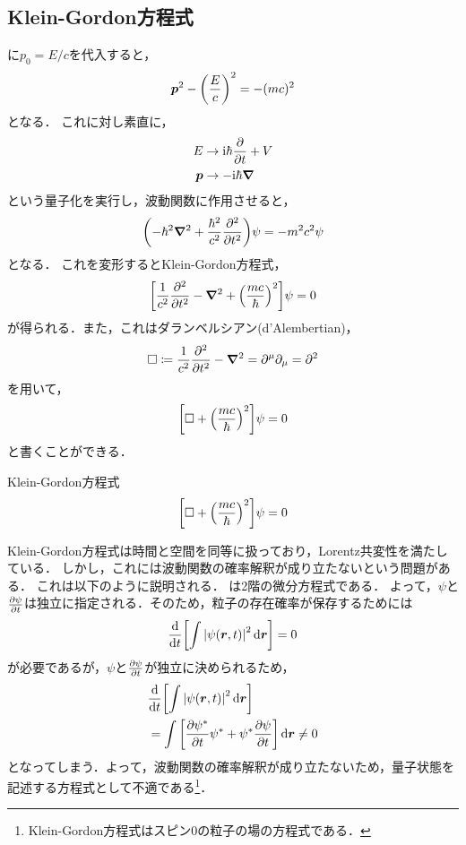 \documentclass{report}
\begin{document}
  \subsection{Klein-Gordon方程式}
    に$p_0 = E/c$を代入すると，
    \begin{align}
      \bm{p}^2 - \qty(\frac{E}{c})^2 = -(mc)^2
    \end{align}
    となる．
    これに対し素直に，
    \begin{align}
      E &\to \mathrm{i}\hbar\pdv{t} + V \\ 
      \bm{p} &\to - \mathrm{i}\hbar\grad 
    \end{align}
    という量子化を実行し，波動関数に作用させると，
    \begin{align}
      \qty(-\hbar^2\grad^2 + \frac{\hbar^2}{c^2}\pdv[2]{t})\psi = -m^2c^2\psi
    \end{align}
    となる．
    これを変形するとKlein-Gordon方程式，
    \begin{align}
      \qty[\frac{1}{c^2}\pdv[2]{t} - \grad^2 + \qty(\frac{mc}{\hbar})^2]\psi = 0 
    \end{align}
    が得られる．また，これはダランベルシアン(d'Alembertian)，
    \begin{align}
      \Box \coloneqq \frac{1}{c^2}\pdv[2]{t} - \grad^2 = \partial^\mu\partial_\mu = \partial^2
    \end{align}
    を用いて，
    \begin{align}
      \qty[\Box + \qty(\frac{mc}{\hbar})^2]\psi = 0
    \end{align}
    と書くことができる．
    \begin{itembox}[l]{Klein-Gordon方程式}
      \begin{align}
        \qty[\Box + \qty(\frac{mc}{\hbar})^2]\psi = 0 \label{Klein-Gordon-equation}
      \end{align}
    \end{itembox}
    \par
    Klein-Gordon方程式は時間と空間を同等に扱っており，Lorentz共変性を満たしている．
    しかし，これには波動関数の確率解釈が成り立たないという問題がある．
    これは以下のように説明される．
    は2階の微分方程式である．
    よって，$\psi$と$\pdv{\psi}{t}$は独立に指定される．そのため，粒子の存在確率が保存するためには
    \begin{align}
      \dv{t}\qty[\int \abs{\psi(\bm{r}, t)}^2 \dd{\bm{r}}] = 0
    \end{align}
    が必要であるが，$\psi$と$\pdv{\psi}{t}$が独立に決められるため，
    \begin{align}
      &\dv{t}\qty[\int \abs{\psi(\bm{r}, t)}^2 \dd{\bm{r}}]\\
      &= \int \qty[\pdv{\psi^*}{t}\psi^{*} + \psi^*\pdv{\psi}{t}] \dd{\bm{r}} \neq 0
    \end{align}
    となってしまう．よって，波動関数の確率解釈が成り立たないため，量子状態を記述する方程式として不適である\footnote{Klein-Gordon方程式はスピン0の粒子の場の方程式である．}．
\end{document}
